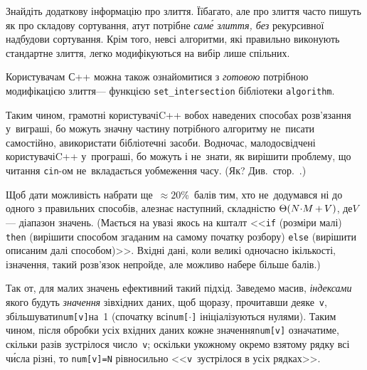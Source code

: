 \documentclass[14pt,a4paper]{extarticle}
\def\dib#1{\,#1\discretionary{}{\mbox{$#1$}}{}\,}
\begin{document}
Знайдіть додаткову інформацію про злиття. Її\nolinebreak[2] багато, але про злиття часто пишуть як про складову сортування, а\nolinebreak[3] тут потрібне \emph{сам\'{е} злиття, без} рекурсивної надбудови сортування. Крім того, не\nolinebreak[3] всі алгоритми, які правильно виконують стандартне злиття, легко модифікуються на вибір лише спільних.

Користувачам С++ можна також ознайомитися з \emph{готовою} потрібною модифікацією злиття\nolinebreak[3] --- функцією \verb"set_intersection" бібліотеки \verb"algorithm".

Таким чином, грамотні користувачі\nolinebreak[3] C++ в\nolinebreak[3] обох наведених способах розв'язання у~виграші, бо можуть значну частину потрібного алгоритму не~писати самостійно, а\nolinebreak[3] використати бібліотечні засоби. Водночас, малодосвідчені користувачі\nolinebreak[3] C++ у~програші, бо можуть і не~знати, як вирішити проблему, що читання \verb"cin"-ом не~вкладається у\nolinebreak[3] обмеження часу. (Як? Див.~стор.~\pageref{text:io-streams-versus-scanf-printf}.)

Щоб дати можливість набрати ще~${\approx}20$\%~балів тим, хто не~додумався ні до одного з правильних способів, але\nolinebreak[3] знає наступний, складністю $\Theta(N{\cdot}M\dib{{+}}V)$, де\nolinebreak[3] $V$\nolinebreak[3] --- діапазон значень. (Мається на увазі якось на кшталт <<\texttt{if} (розміри малі) \texttt{then} (вирішити способом згаданим на самому початку розбору) \texttt{else} (вирішити описаним далі способом)>>. Вхідні дані, коли великі одночасно і\nolinebreak[3] кількості, і\nolinebreak[3] значення, такий розв'язок не\nolinebreak[3] пройде, але можливо набере більше балів.)

Так от, для малих значень ефективний такий підхід. Заведемо масив, \emph{індексами} якого будуть \emph{значення} зі\nolinebreak[3] вхідних даних, щоб щоразу, прочитавши деяке~\texttt{v}, збільшувати\nolinebreak[2] \texttt{num[v]}\nolinebreak[2] на~1 (спочатку всі\nolinebreak[3] \texttt{num[$\cdot$]} ініціалізуються нулями). Таким чином, після обробки усіх вхідних даних кожне значення\nolinebreak[2] \texttt{num[v]} означатиме, скільки разів зустрілося число~\texttt{v}; оскільки у\nolinebreak[3] кожному окремо взятому рядку всі ч\'{и}сла різні, то \mbox{\texttt{num[v]=N}} рівносильно <<\texttt{v}~зустрілося в усіх рядках>>.\label{text:omnipresent-numbers-end}
\end{document}
